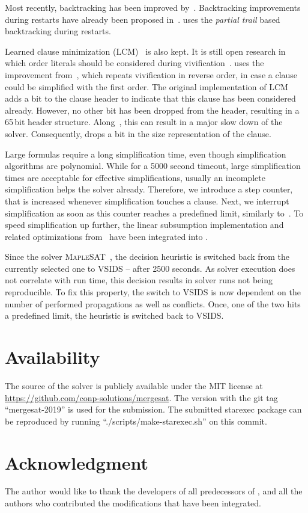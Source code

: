 \documentclass[conference]{IEEEtran}
\begin{document}
Most recently, backtracking has been improved by~\cite{10.1007/978-3-319-94144-8_7}. Backtracking improvements during restarts have already been proposed in~\cite{10.1007/978-3-642-21581-0_18}.
\mergesat uses the \emph{partial trail} based backtracking during restarts.

Learned clause minimization (LCM)~\cite{ijcai2017-98} is also kept. It is still open research in which order literals should be considered during vivification~\cite{DBLP:conf/ecai/PietteHS08}.
\mergesat uses the improvement from~\cite{riss71}, which repeats vivification in reverse order, in case a clause could be simplified with the first order.
The original implementation of LCM adds a bit to the clause header to indicate that this clause has been considered already.
However, no other bit has been dropped from the header, resulting in a 65\,bit header structure.
Along~\cite{HolldoblerMS:2010}, this can result in a major slow down of the solver.
Consequently, \mergesat drops a bit in the size representation of the clause.

Large formulas require a long simplification time, even though simplification algorithms are polynomial.
While for a 5000 second timeout, large simplification times are acceptable for effective simplifications, usually an incomplete simplification helps the solver already.
Therefore, we introduce a step counter, that is increased whenever simplification touches a clause.
Next, we interrupt simplification as soon as this counter reaches a predefined limit, similarly to~\cite{precosat}.
To speed simplification up further, the linear subsumption implementation and related optimizations from~\cite{POS-18:Tuning_Parallel_SAT_Solvers} have been integrated into \mergesat.

Since the solver \textsc{MapleSAT}~\cite{MapleSAT}, the decision heuristic is switched back from the currently selected one to VSIDS -- after 2500 seconds.
As solver execution does not correlate with run time, this decision results in solver runs not being reproducible.
To fix this property, the switch to VSIDS is now dependent on the number of performed propagations as well as conflicts.
Once, one of the two hits a predefined limit, the heuristic is switched back to VSIDS.

\section{Availability}

The source of the solver is publicly available under the MIT license at \url{https://github.com/conp-solutions/mergesat}.
The version with the git tag ``mergesat-2019'' is used for the submission.
The submitted starexec package can be reproduced by running ``./scripts/make-starexec.sh'' on this commit.

\section*{Acknowledgment}

The author would like to thank the developers of all predecessors of \mergesat, and all the authors who contributed the modifications that have been integrated.



\end{document}
